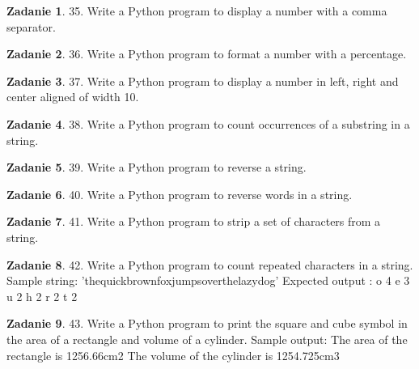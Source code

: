 \documentclass[11pt]{article}
\theoremstyle{definition}
\newtheorem{zadanie}{Zadanie}
\begin{document}
\begin{zadanie}


35. Write a Python program to display a number with a comma separator. 

\end{zadanie}

\begin{zadanie}


36. Write a Python program to format a number with a percentage. 

\end{zadanie}

\begin{zadanie}


37. Write a Python program to display a number in left, right and center aligned of width 10. 

\end{zadanie}

\begin{zadanie}


38. Write a Python program to count occurrences of a substring in a string. 

\end{zadanie}

\begin{zadanie}


39. Write a Python program to reverse a string. 

\end{zadanie}

\begin{zadanie}


40. Write a Python program to reverse words in a string. 

\end{zadanie}

\begin{zadanie}


41. Write a Python program to strip a set of characters from a string. 

\end{zadanie}

\begin{zadanie}


42. Write a Python program to count repeated characters in a string. 
Sample string: 'thequickbrownfoxjumpsoverthelazydog'
Expected output :
o 4
e 3
u 2
h 2
r 2
t 2

\end{zadanie}

\begin{zadanie}


43. Write a Python program to print the square and cube symbol in the area of a rectangle and volume of a cylinder. 
Sample output:
The area of the rectangle is 1256.66cm2
The volume of the cylinder is 1254.725cm3

\end{zadanie}
\end{document}
